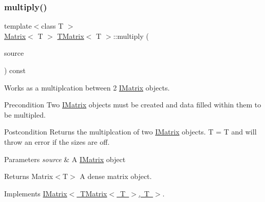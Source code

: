 \subsubsection{\texorpdfstring{multiply()}{multiply()}\hspace{0.1cm}{\footnotesize\ttfamily [2/6]}}
{\footnotesize\ttfamily template$<$class T $>$ \\
\mbox{\hyperlink{class_matrix}{Matrix}}$<$ T $>$ \mbox{\hyperlink{class_t_matrix}{T\+Matrix}}$<$ T $>$\+::multiply (\begin{DoxyParamCaption}\item[{const \mbox{\hyperlink{class_i_matrix}{I\+Matrix}}$<$ \mbox{\hyperlink{class_t_matrix}{T\+Matrix}}$<$ T $>$, T $>$ \&}]{source }\end{DoxyParamCaption}) const\hspace{0.3cm}{\ttfamily [virtual]}}



Works as a multiplcation between 2 \mbox{\hyperlink{class_i_matrix}{I\+Matrix}} objects. 

\begin{DoxyPrecond}{Precondition}
Two \mbox{\hyperlink{class_i_matrix}{I\+Matrix}} objects must be created and data filled within them to be multipled. 
\end{DoxyPrecond}
\begin{DoxyPostcond}{Postcondition}
Returns the multiplcation of two \mbox{\hyperlink{class_i_matrix}{I\+Matrix}} objects. T = T and will throw an error if the sizes are off.
\end{DoxyPostcond}

\begin{DoxyParams}{Parameters}
{\em source} & A \mbox{\hyperlink{class_i_matrix}{I\+Matrix}} object \\
\hline
\end{DoxyParams}
\begin{DoxyReturn}{Returns}
Matrix$<$\+T$>$ A dense matrix object. 
\end{DoxyReturn}


Implements \mbox{\hyperlink{class_i_matrix_aa4d4f7ce2daec7d68ff8fd590652544d}{I\+Matrix$<$ T\+Matrix$<$ T $>$, T $>$}}.

\mbox{\label{class_t_matrix_a4380f9d0e1e9ecd6d46dcbce83701872}} 
